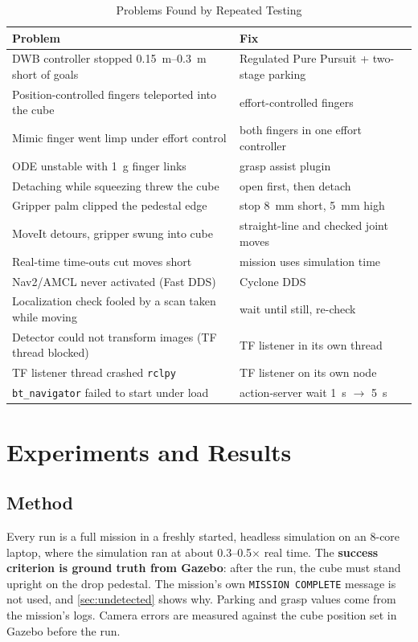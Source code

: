 \documentclass[journal]{IEEEtran}
\begin{document}
\begin{table}[t]
\caption{Problems Found by Repeated Testing}
\label{tab:problems}
\centering
\footnotesize
\begin{tabular}{@{}L{0.49\columnwidth}L{0.46\columnwidth}@{}}
\toprule
Problem & Fix \\
\midrule
DWB controller stopped \SIrange{0.15}{0.3}{m} short of goals & Regulated Pure Pursuit + two-stage parking \\
Position-controlled fingers teleported into the cube & effort-controlled fingers \\
Mimic finger went limp under effort control & both fingers in one effort controller \\
ODE unstable with \SI{1}{g} finger links & grasp assist plugin \\
Detaching while squeezing threw the cube & open first, then detach \\
Gripper palm clipped the pedestal edge & stop \SI{8}{mm} short, \SI{5}{mm} high \\
MoveIt detours, gripper swung into cube & straight-line and checked joint moves \\
Real-time time-outs cut moves short & mission uses simulation time \\
Nav2/AMCL never activated (Fast DDS) & Cyclone DDS \\
Localization check fooled by a scan taken while moving & wait until still, re-check \\
Detector could not transform images (TF thread blocked) & TF listener in its own thread \\
TF listener thread crashed \texttt{rclpy} & TF listener on its own node \\
\texttt{bt\_navigator} failed to start under load & action-server wait \SI{1}{s} $\to$ \SI{5}{s} \\
\bottomrule
\end{tabular}
\end{table}

\section{Experiments and Results}

\subsection{Method}
Every run is a full mission in a freshly started, headless simulation on an 8-core laptop, where the simulation ran at about 0.3--0.5$\times$ real time. The \textbf{success criterion is ground truth from Gazebo}: after the run, the cube must stand upright on the drop pedestal. The mission's own \texttt{MISSION COMPLETE} message is not used, and \cref{sec:undetected} shows why. Parking and grasp values come from the mission's logs. Camera errors are measured against the cube position set in Gazebo before the run.
\end{document}
